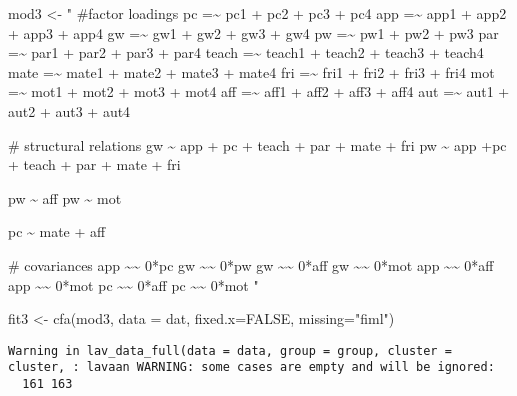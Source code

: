 \documentclass[
  letterpaper,
  DIV=11,
  numbers=noendperiod]{scrartcl}
\newenvironment{Shaded}{\begin{snugshade}}{\end{snugshade}}
\newcommand{\AttributeTok}[1]{\textcolor[rgb]{0.40,0.45,0.13}{#1}}
\newcommand{\ConstantTok}[1]{\textcolor[rgb]{0.56,0.35,0.01}{#1}}
\newcommand{\FunctionTok}[1]{\textcolor[rgb]{0.28,0.35,0.67}{#1}}
\newcommand{\NormalTok}[1]{\textcolor[rgb]{0.00,0.23,0.31}{#1}}
\newcommand{\OtherTok}[1]{\textcolor[rgb]{0.00,0.23,0.31}{#1}}
\newcommand{\StringTok}[1]{\textcolor[rgb]{0.13,0.47,0.30}{#1}}
\begin{document}
\begin{Shaded}
\begin{Highlighting}[]
\NormalTok{mod3 }\OtherTok{\textless{}{-}} \StringTok{"}
\StringTok{\#factor loadings}
\StringTok{pc =\textasciitilde{} pc1 + pc2 + pc3 + pc4}
\StringTok{app =\textasciitilde{} app1 + app2 + app3 + app4}
\StringTok{gw =\textasciitilde{} gw1 + gw2 + gw3 + gw4}
\StringTok{pw =\textasciitilde{} pw1 + pw2 + pw3}
\StringTok{par =\textasciitilde{} par1 + par2 + par3 + par4}
\StringTok{teach =\textasciitilde{} teach1 + teach2 + teach3 + teach4}
\StringTok{mate =\textasciitilde{} mate1 + mate2 + mate3 + mate4}
\StringTok{fri =\textasciitilde{} fri1 + fri2 + fri3 + fri4}
\StringTok{mot =\textasciitilde{} mot1 + mot2 + mot3 + mot4}
\StringTok{aff =\textasciitilde{} aff1 + aff2 + aff3 + aff4}
\StringTok{aut =\textasciitilde{} aut1 + aut2 + aut3 + aut4}

\StringTok{\# structural relations}
\StringTok{gw \textasciitilde{} app + pc + teach + par + mate + fri}
\StringTok{pw \textasciitilde{} app +pc + teach + par + mate + fri}

\StringTok{pw \textasciitilde{} aff}
\StringTok{pw \textasciitilde{} mot}

\StringTok{pc \textasciitilde{} mate + aff}

\StringTok{\# covariances}
\StringTok{app \textasciitilde{}\textasciitilde{} 0*pc}
\StringTok{gw \textasciitilde{}\textasciitilde{} 0*pw}
\StringTok{gw \textasciitilde{}\textasciitilde{} 0*aff}
\StringTok{gw \textasciitilde{}\textasciitilde{} 0*mot}
\StringTok{app \textasciitilde{}\textasciitilde{} 0*aff}
\StringTok{app \textasciitilde{}\textasciitilde{} 0*mot}
\StringTok{pc \textasciitilde{}\textasciitilde{} 0*aff}
\StringTok{pc \textasciitilde{}\textasciitilde{} 0*mot}
\StringTok{"}
\end{Highlighting}
\end{Shaded}

\begin{Shaded}
\begin{Highlighting}[]
\NormalTok{fit3 }\OtherTok{\textless{}{-}} \FunctionTok{cfa}\NormalTok{(mod3, }\AttributeTok{data =}\NormalTok{ dat, }\AttributeTok{fixed.x=}\ConstantTok{FALSE}\NormalTok{, }\AttributeTok{missing=}\StringTok{"fiml"}\NormalTok{)}
\end{Highlighting}
\end{Shaded}

\begin{verbatim}
Warning in lav_data_full(data = data, group = group, cluster = cluster, : lavaan WARNING: some cases are empty and will be ignored:
  161 163
\end{verbatim}
\end{document}
